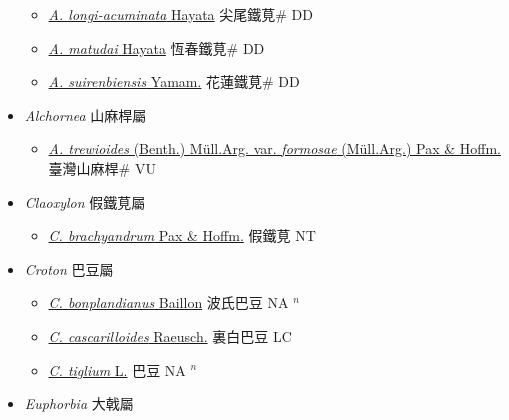 \begin{itemize}
\begin{itemize}
        \item[] \href{http://www.theplantlist.org/tpl1.1/search?q=Acalypha+longi-acuminata}{\textit{A. longi-acuminata} Hayata}   尖尾鐵莧\# DD
        \item[] \href{http://www.theplantlist.org/tpl1.1/search?q=Acalypha+matudai}{\textit{A. matudai} Hayata}   恆春鐵莧\# DD
        \item[] \href{http://www.theplantlist.org/tpl1.1/search?q=Acalypha+suirenbiensis}{\textit{A. suirenbiensis} Yamam.}   花蓮鐵莧\# DD
  \end{itemize}
 \item[] \textit{Alchornea} 山麻桿屬
                    
  \begin{itemize}
        \item[] \href{http://www.theplantlist.org/tpl1.1/search?q=Alchornea+trewioides+var.+formosae}{\textit{A. trewioides} (Benth.) Müll.Arg. var. \textit{formosae} (Müll.Arg.) Pax \& Hoffm.}   臺灣山麻桿\# VU
  \end{itemize}
 \item[] \textit{Claoxylon} 假鐵莧屬
                    
  \begin{itemize}
        \item[] \href{http://www.theplantlist.org/tpl1.1/search?q=Claoxylon+brachyandrum}{\textit{C. brachyandrum} Pax \& Hoffm.}   假鐵莧 NT
  \end{itemize}
 \item[] \textit{Croton} 巴豆屬
                    
  \begin{itemize}
        \item[] \href{http://www.theplantlist.org/tpl1.1/search?q=Croton+bonplandianus}{\textit{C. bonplandianus} Baillon}   波氏巴豆 NA $^n$
        \item[] \href{http://www.theplantlist.org/tpl1.1/search?q=Croton+cascarilloides}{\textit{C. cascarilloides} Raeusch.}   裏白巴豆 LC
        \item[] \href{http://www.theplantlist.org/tpl1.1/search?q=Croton+tiglium}{\textit{C. tiglium} L.}   巴豆 NA $^n$
  \end{itemize}
 \item[] \textit{Euphorbia} 大戟屬
                    

\end{itemize}
